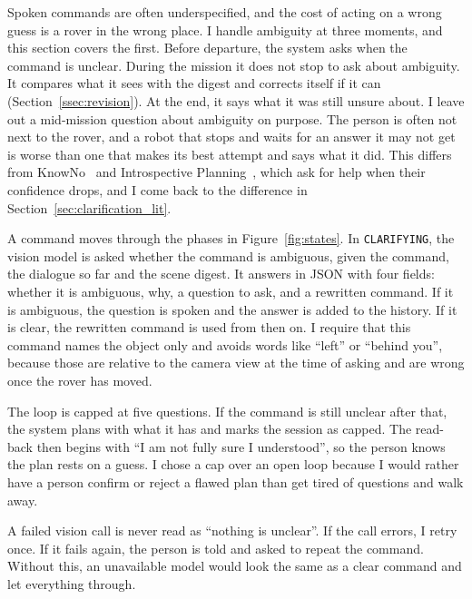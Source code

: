 Spoken commands are often underspecified, and the cost of acting on a wrong guess
is a rover in the wrong place. I handle ambiguity at three moments, and this
section covers the first. Before departure, the system asks when the command is
unclear. During the mission it does not stop to ask about ambiguity. It compares
what it sees with the digest and corrects itself if it can
(Section~\ref{ssec:revision}). At the end, it says what it was still unsure
about. I leave out a mid-mission question about ambiguity on purpose. The person
is often not next to the rover, and a robot that stops and waits for an answer it
may not get is worse than one that makes its best attempt and says what it did.
This differs from KnowNo~\cite{ren2023knowno} and Introspective
Planning~\cite{liang2024introspective}, which ask for help when their confidence
drops, and I come back to the difference in Section~\ref{sec:clarification_lit}.

\label{ssec:statemachine}

A command moves through the phases in Figure~\ref{fig:states}. In
\texttt{CLARIFYING}, the vision model is asked whether the command is ambiguous,
given the command, the dialogue so far and the scene digest. It answers in JSON
with four fields: whether it is ambiguous, why, a question to ask, and a rewritten
command. If it is ambiguous, the question is spoken and the answer is added to the
history. If it is clear, the rewritten command is used from then on. I require
that this command names the object only and avoids words like ``left'' or
``behind you'', because those are relative to the camera view at the time of
asking and are wrong once the rover has moved.

The loop is capped at five questions. If the command is still unclear after that,
the system plans with what it has and marks the session as capped. The read-back
then begins with ``I am not fully sure I understood'', so the person knows the
plan rests on a guess. I chose a cap over an open loop because I would rather have
a person confirm or reject a flawed plan than get tired of questions and walk
away.

A failed vision call is never read as ``nothing is unclear''. If the call errors,
I retry once. If it fails again, the person is told and asked to repeat the
command. Without this, an unavailable model would look the same as a clear
command and let everything through.

